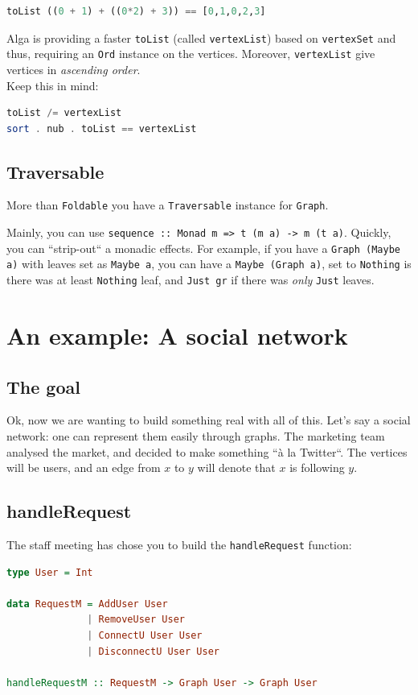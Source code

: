\documentclass[10pt,a4paper]{article}
\begin{document}
\begin{lstlisting}[language=Haskell, frame=single]
toList ((0 + 1) + ((0*2) + 3)) == [0,1,0,2,3]
\end{lstlisting}

Alga is providing a faster \verb|toList| (called \verb|vertexList|) based on \verb|vertexSet| and thus, requiring an \verb|Ord| instance on the vertices. Moreover, \verb|vertexList| give vertices in \emph{ascending order}.
\\
Keep this in mind:
\begin{lstlisting}[language=Haskell, frame=single]
toList /= vertexList
sort . nub . toList == vertexList
\end{lstlisting}

\subsection{Traversable}
More than \verb|Foldable| you have a \verb|Traversable| instance for \verb|Graph|.

Mainly, you can use \verb|sequence :: Monad m => t (m a) -> m (t a)|. Quickly, you can ``strip-out`` a monadic effects. For example, if you have a \verb|Graph (Maybe a)| with leaves set as \verb|Maybe a|, you can have a \verb|Maybe (Graph a)|, set to \verb|Nothing| is there was at least \verb|Nothing| leaf, and \verb|Just gr| if there was \emph{only} \verb|Just| leaves.

\section{An example: A social network}
\subsection{The goal}

Ok, now we are wanting to build something real with all of this. Let's say a social network: one can represent them easily through graphs.
The marketing team analysed the market, and decided to make something ``à la Twitter``. The vertices will be users, and an edge from $x$ to $y$ will denote that $x$ is following $y$.

\subsection{handleRequest}
The staff meeting has chose you to build the \verb|handleRequest| function:
\begin{lstlisting}[language=Haskell, frame=single]
type User = Int

data RequestM = AddUser User
			  | RemoveUser User
			  | ConnectU User User
			  | DisconnectU User User

handleRequestM :: RequestM -> Graph User -> Graph User
\end{lstlisting}
\end{document}
